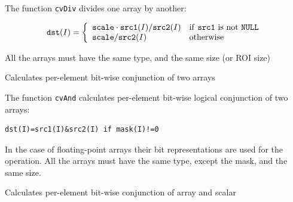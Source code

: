 \begin{description}
\end{description}

The function \texttt{cvDiv} divides one array by another:

\[
\texttt{dst}(I)=\left\{ \begin{array}{l l} \texttt{scale} \cdot \texttt{src1}(I)/\texttt{src2}(I) & \mbox{if \texttt{src1} is not \texttt{NULL}}\\ \texttt{scale}/\texttt{src2}(I) & \mbox{otherwise}\\ \end{array} \right.
\]

All the arrays must have the same type, and the same size (or ROI size)


\label{And}

Calculates per-element bit-wise conjunction of two arrays


\begin{description}
\end{description}


The function \texttt{cvAnd} calculates per-element bit-wise logical conjunction of two arrays:

\begin{lstlisting}
dst(I)=src1(I)&src2(I) if mask(I)!=0
\end{lstlisting}

In the case of floating-point arrays their bit representations are used for the operation. All the arrays must have the same type, except the mask, and the same size.

\label{AndS}

Calculates per-element bit-wise conjunction of array and scalar


\begin{description}
\end{description}

